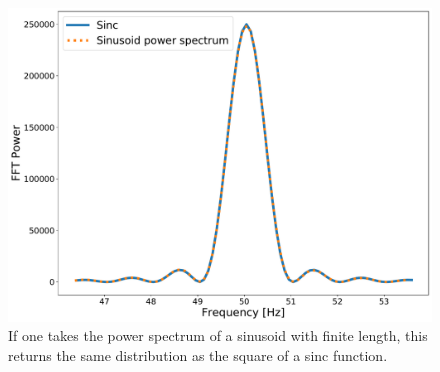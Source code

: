 \begin{figure}
	\centering
	\includegraphics[width=0.7\linewidth]{AppendixA/sinc_fft.pdf}
	\caption[Sinc function compared to \gls{FFT} of finite length sinusoid.]{If one takes the power spectrum of a sinusoid with finite length, this returns the same distribution as the square of a sinc function.}
	\label{app1:sin:sinc}
\end{figure}

